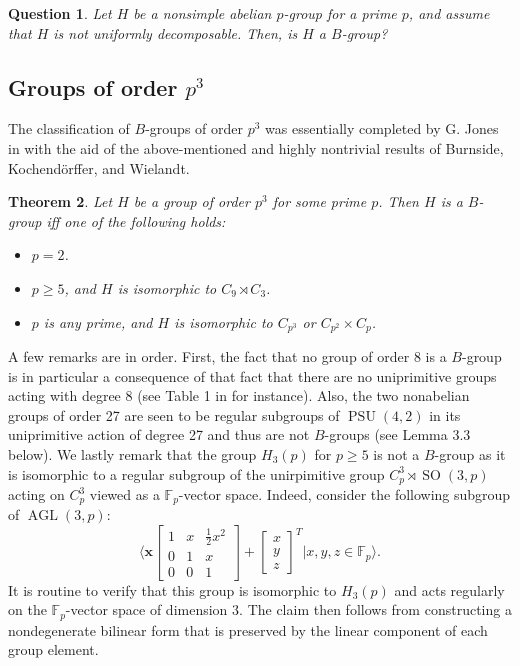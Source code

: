 \documentclass[12pt]{amsart}
\newtheorem{theorem}{Theorem}[section]
\newtheorem{question}[theorem]{Question}
\theoremstyle{definition}
\newcommand{\F}{\mathbb{F}}
\newcommand{\la}{\langle}
\newcommand{\ra}{\rangle}
\DeclareMathOperator{\PSU}{PSU}
\DeclareMathOperator{\AGL}{AGL}
\DeclareMathOperator{\SO}{SO}
\begin{document}
	\begin{question}
		Let $H$ be a nonsimple abelian $p$-group for a prime $p$, and assume that $H$ is not uniformly decomposable. Then, is $H$ a $B$-group?
	\end{question}

\subsection{Groups of order $p^3$}

The classification of $B$-groups of order $p^3$ was essentially completed by G. Jones in \cite{Jones} with the aid of the above-mentioned and highly nontrivial results of Burnside, Kochend\"orffer, and Wielandt. 

\begin{theorem}\label{BKWJ}
	Let $H$ be a group of order $p^3$ for some prime $p$. Then $H$ is a $B$-group iff one of the following holds:
	\begin{itemize}
		\item[(i)] $p = 2$.
		\item[(ii)] $p \geq 5$, and $H$ is isomorphic to $C_9 \rtimes C_3$.
		\item[(iii)] $p$ is any prime, and $H$ is isomorphic to $C_{p^3}$ or $C_{p^2} \times C_p$.
	\end{itemize}
\end{theorem}
A few remarks are in order. First, the fact that no group of order 8 is a $B$-group is in particular a consequence of that fact that there are no uniprimitive groups acting with degree 8 (see Table 1 in \cite{Wild2} for instance). Also, the two nonabelian groups of order 27 are seen to be regular subgroups of $\PSU(4,2)$ in its uniprimitive action of degree 27 and thus are not $B$-groups (see Lemma 3.3 below). We lastly remark that the group $H_3(p)$ for $p \geq 5$ is not a $B$-group as it is isomorphic to a regular subgroup of the unirpimitive group $C_p^3 \rtimes \SO(3,p)$ acting on $C_p^3$ viewed as a $\F_p$-vector space. Indeed, consider the following subgroup of $\AGL(3,p)$:
\begin{equation}
	\bigg\la \textbf{x}
	\begin{bmatrix} 
		1 & x & \frac{1}{2}x^2 \\ 
		0 & 1 & x \\
		0 & 0 & 1
	\end{bmatrix} +
	\begin{bmatrix}
		x \\ y \\ z
	\end{bmatrix}^T \bigg| x,y,z \in \F_p \bigg\ra.
\end{equation}
It is routine to verify that this group is isomorphic to $H_3(p)$ and acts regularly on the $\F_p$-vector space of dimension $3$. The claim then follows from constructing a nondegenerate bilinear form that is preserved by the linear component of each group element.
	
\end{document}

